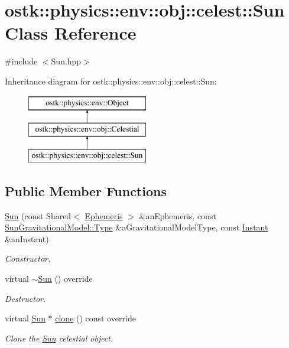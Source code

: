 \hypertarget{classostk_1_1physics_1_1env_1_1obj_1_1celest_1_1_sun}{}\section{ostk\+:\+:physics\+:\+:env\+:\+:obj\+:\+:celest\+:\+:Sun Class Reference}
\label{classostk_1_1physics_1_1env_1_1obj_1_1celest_1_1_sun}


{\ttfamily \#include $<$Sun.\+hpp$>$}

Inheritance diagram for ostk\+:\+:physics\+:\+:env\+:\+:obj\+:\+:celest\+:\+:Sun\+:\begin{figure}[H]
\begin{center}
\leavevmode
\includegraphics[height=3.000000cm]{classostk_1_1physics_1_1env_1_1obj_1_1celest_1_1_sun}
\end{center}
\end{figure}
\subsection*{Public Member Functions}
\begin{DoxyCompactItemize}
\item 
\hyperlink{classostk_1_1physics_1_1env_1_1obj_1_1celest_1_1_sun_a2d5aefec88db6bdb17c36f6418b223a5}{Sun} (const Shared$<$ \hyperlink{classostk_1_1physics_1_1env_1_1_ephemeris}{Ephemeris} $>$ \&an\+Ephemeris, const \hyperlink{classostk_1_1physics_1_1environment_1_1gravitational_1_1_sun_ae567145f71c7750a9e4e43a309bd19db}{Sun\+Gravitational\+Model\+::\+Type} \&a\+Gravitational\+Model\+Type, const \hyperlink{classostk_1_1physics_1_1time_1_1_instant}{Instant} \&an\+Instant)
\begin{DoxyCompactList}\small\item\em Constructor. \end{DoxyCompactList}\item 
virtual \hyperlink{classostk_1_1physics_1_1env_1_1obj_1_1celest_1_1_sun_a1f4396f48b20848291a13f7033a14a58}{$\sim$\+Sun} () override
\begin{DoxyCompactList}\small\item\em Destructor. \end{DoxyCompactList}\item 
virtual \hyperlink{classostk_1_1physics_1_1env_1_1obj_1_1celest_1_1_sun}{Sun} $\ast$ \hyperlink{classostk_1_1physics_1_1env_1_1obj_1_1celest_1_1_sun_a57fd7c3c48115f77e2d3d331ef0e8e0a}{clone} () const override
\begin{DoxyCompactList}\small\item\em Clone the \hyperlink{classostk_1_1physics_1_1env_1_1obj_1_1celest_1_1_sun}{Sun} celestial object. \end{DoxyCompactList}\end{DoxyCompactItemize}
